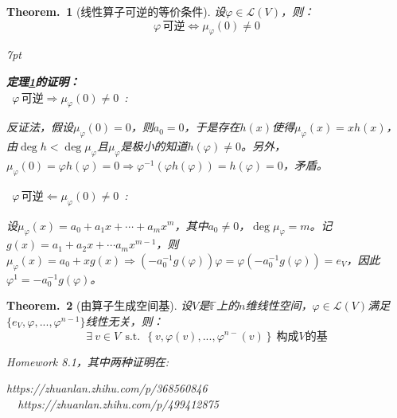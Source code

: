 \documentclass[zihao=-4,UTF8]{report}
\theoremstyle{mystyle} %
\newtheorem{theorem}{Theorem.\,}
\newenvironment{graybox}{%
\def\FrameCommand{%
\hspace{1pt}%
{\color{gray}\small \vrule width 2pt}%
{\color{graybox_color}\vrule width 4pt}%
\colorbox{graybox_color}%
}%
\MakeFramed{\advance\hsize-\width\FrameRestore}%
\noindent\hspace{-4.55pt}%
\begin{adjustwidth}{}{7pt}%
\vspace{2pt}\vspace{2pt}%
}
{%
\vspace{2pt}\end{adjustwidth}\endMakeFramed%
}
\begin{document}
\begin{theorem}[线性算子可逆的等价条件]\label{线性算子可逆的等价条件}
设$\varphi \in \mathscr{L}(V)$，则：
\begin{equation*}
    \varphi\, \text{可逆} \Longleftrightarrow \mu_{\varphi}(0) \ne 0 
\end{equation*}

\begin{graybox}
\textbf{定理\ref{线性算子可逆的等价条件}的证明：}\\
\ $\varphi\, \text{可逆} \Longrightarrow \mu_{\varphi}(0) \ne 0$\ :\par
反证法，假设$\mu_{\varphi}(0) = 0$，则$a_0 = 0$，于是存在$h(x)$使得$\mu_{\varphi}(x) = xh(x)$，由$\deg h < \deg \mu_{\varphi}$且$\mu_{\varphi}$是极小的知道$h(\varphi) \ne 0$。另外，$\mu_{\varphi}(0) = \varphi h(\varphi) = 0 \Longrightarrow \varphi^{-1}(\varphi h(\varphi)) = h(\varphi) = 0$，矛盾。\par
\noindent{}\ $\varphi\, \text{可逆} \Longleftarrow\mu_{\varphi}(0) \ne 0$\ :\par
设$\mu_{\varphi}(x) = a_0 + a_1x + \cdots +a_mx^m$，其中$a_0 \ne 0$，$\deg \mu_{\varphi} = m$。记$g(x) = a_1 + a_2x + \cdots a_mx^{m-1}$，则$\mu_{\varphi}(x) = a_0 + xg(x) \Longrightarrow (-a_0^{-1}g(\varphi))\varphi = \varphi(-a_0^{-1}g(\varphi)) = e_V$，因此$\varphi^{1} = -a_0^{-1}g(\varphi)$。
\end{graybox}
\end{theorem}

\begin{theorem}[由算子生成空间基]\label{由算子生成空间基}
设$V$是$\mathbb{F}$上的$n$维线性空间，$\varphi \in \mathscr{L}(V)$满足$\{e_V,\varphi,...,\varphi^{n-1}\}$线性无关，则：
\begin{equation*}
    \exists\ v \in V\ \ \text{s.t.}\ \ \left\{v,\varphi(v),...,\varphi^{n-}(v) \right\}\ \text{构成$V$的基}
\end{equation*}
{\par\color{gray}\small
Homework 8.1，其中两种证明在:\par
https://zhuanlan.zhihu.com/p/368560846 \ \ 
https://zhuanlan.zhihu.com/p/499412875
\par}
\end{theorem}
\end{document}

